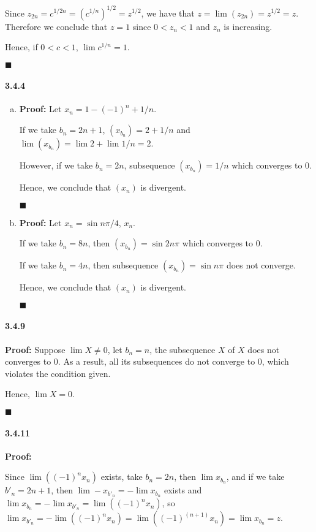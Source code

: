 \documentclass[11pt]{article}
\newcommand{\qed}{\begin{flushright}
					$\blacksquare$
				  \end{flushright}}
\begin{document}
		Since $z_{2n} = c^{1/2n} = (c^{1/n})^{1/2} = z^{1/2}$, we have that $z = \lim (z_{2n}) = z^{1/2} = z$. Therefore we conclude that $z = 1$ since $0 < z_n < 1$ and $z_n$ is increasing.
		
		Hence, if $0 < c < 1$, $\lim c^{1/n} = 1$.
		\qed
	\paragraph{3.4.4}
		\begin{enumerate}[(a)]
			\item \textbf{Proof:}
				Let $x_n = 1 - (-1)^n + 1/n$.
			
				If we take $b_n = 2n + 1$, $(x_{b_n}) = 2 + 1/n$ and $\lim (x_{b_n}) = \lim 2  + \lim 1/n = 2$.
				
				However, if we take $b_n = 2n$, subsequence $(x_{b_n}) = 1/n$ which converges to $0$.
				
				Hence, we conclude that $(x_n)$ is divergent.
				\qed
				 
			\item \textbf{Proof:}
				Let $x_n = \sin n\pi / 4$, $x_n$.
				
				If we take $b_n = 8n$, then $(x_{b_n}) = \sin 2n\pi$ which converges to $0$.
				
				If we take $b_n = 4n$, then subsequence $(x_{b_n}) = \sin n\pi$ does not converge.
				
				Hence, we conclude that $(x_n)$ is divergent.
				\qed
		\end{enumerate}
	\paragraph{3.4.9}
		\textbf{Proof:} Suppose $\lim X \neq 0$, let $b_n = n$, the subsequence $X$ of $X$ does not converges to $0$. As a result, all its subsequences do not converge to $0$, which violates the condition given.
		
		Hence, $\lim X = 0$.
		\qed 
	\paragraph{3.4.11}
		\textbf{Proof:} 
		
		Since $\lim ((-1)^n x_n)$ exists, take $b_n = 2n$, then $\lim x_{b_n}$, and if we take $b'_n = 2n + 1$, then $\lim -x_{b'_n} = -\lim x_{b_n}$ exists and $\lim x_{b_n} = -\lim x_{b'_n} = \lim ((-1)^n x_n)$, so $\lim x_{b'_n} = -\lim ((-1)^n x_n) = \lim ((-1)^(n + 1) x_n) = \lim x_{b_n} = z$.
		
\end{document}
